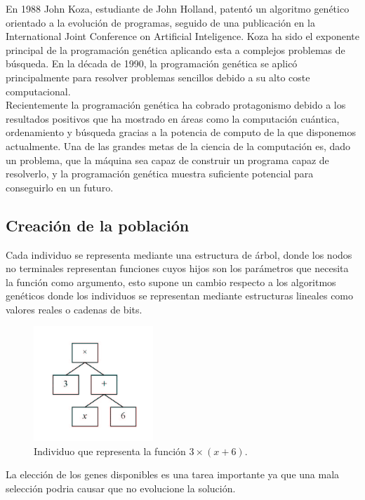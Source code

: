 \documentclass[12pt]{article} \usepackage[utf8x]{inputenc}
\begin{document}
En 1988 John Koza, estudiante de John Holland, patentó un algoritmo
genético orientado a la evolución de programas, seguido de una
publicación en la International Joint Conference on Artificial
Inteligence. Koza ha sido el exponente principal de la programación
genética aplicando esta a complejos problemas de búsqueda.
En la década de 1990, la programación genética se aplicó 
principalmente para resolver problemas sencillos debido a su alto 
coste computacional.\\

Recientemente la programación genética ha cobrado protagonismo debido 
a los resultados positivos que ha mostrado en áreas como la computación
cuántica, ordenamiento y búsqueda gracias a la potencia de computo de
la que disponemos actualmente. Una de las grandes metas de la ciencia 
de la computación es, dado un problema, que la máquina sea capaz de
construir un programa capaz de resolverlo, y la programación genética
muestra suficiente potencial para conseguirlo en un futuro.\\


\subsection {Creación de la población}

Cada individuo se representa mediante una estructura de árbol, donde 
los nodos no terminales representan funciones cuyos hijos son los 
parámetros que necesita la función como argumento, esto supone un
cambio respecto a los algoritmos genéticos donde los individuos se
representan mediante estructuras lineales como valores reales o
cadenas de bits.

\begin{figure}[H]
    \centering
    \includegraphics[width=0.4\textwidth]{individuo.PNG}
    \caption{Individuo que representa la función \(3\times(x+6)\).}
    \label{fig:dfd:1}
\end{figure}

La elección de los genes disponibles es una tarea importante 
ya que una mala selección podria causar que no evolucione 
la solución.\\
\end{document}
